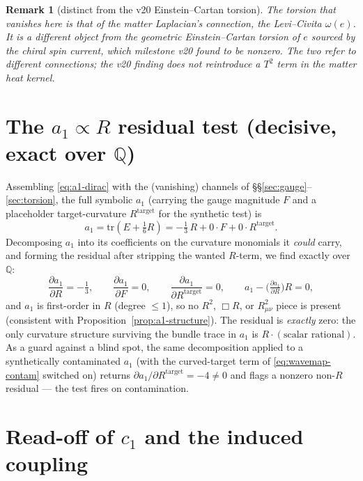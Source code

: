 \documentclass[11pt]{article}
\newtheorem{remark}{Remark}
\newcommand{\QQ}{\mathbb{Q}}
\newcommand{\tr}{\mathrm{tr}}
\newcommand{\Rt}{R^{\mathrm{target}}}
\begin{document}
\begin{remark}[distinct from the v20 Einstein--Cartan torsion]
The torsion that vanishes here is that of the \emph{matter Laplacian's} connection, the
Levi--Civita $\omega(e)$. It is a different object from the \emph{geometric} Einstein--Cartan
torsion of $e$ sourced by the chiral spin current, which milestone v20 found to be nonzero.
The two refer to different connections; the v20 finding does not reintroduce a $T^2$ term in
the matter heat kernel.
\end{remark}

\section{The $a_1\propto R$ residual test (decisive, exact over $\QQ$)}\label{sec:residual}

Assembling \eqref{eq:a1-dirac} with the (vanishing) channels of \S\S\ref{sec:gauge}--\ref{sec:torsion},
the full symbolic $a_1$ (carrying the gauge magnitude $F$ and a placeholder target-curvature
$\Rt$ for the synthetic test) is
\begin{equation}\label{eq:a1-full}
a_1=\tr(E+\tfrac16 R)= -\tfrac13\,R+0\cdot F+0\cdot \Rt .
\end{equation}
Decomposing $a_1$ into its coefficients on the curvature monomials it \emph{could} carry, and
forming the residual after stripping the wanted $R$-term, we find exactly over $\QQ$:
\begin{equation}\label{eq:residual}
\frac{\partial a_1}{\partial R}=-\tfrac13,\qquad
\frac{\partial a_1}{\partial F}=0,\qquad
\frac{\partial a_1}{\partial \Rt}=0,\qquad
a_1-\Big(\tfrac{\partial a_1}{\partial R}\Big)R=0,
\end{equation}
and $a_1$ is first-order in $R$ (degree $\le 1$), so no $R^2$, $\Box R$, or $R_{\mu\nu}^2$ piece
is present (consistent with Proposition~\ref{prop:a1-structure}). The residual is
\emph{exactly} zero: the only curvature structure surviving the bundle trace in $a_1$ is
$R\cdot(\text{scalar rational})$. As a guard against a blind spot, the same decomposition
applied to a synthetically contaminated $a_1$ (with the curved-target term of
\eqref{eq:wavemap-contam} switched on) returns $\partial a_1/\partial\Rt=-4\neq0$ and flags a
nonzero non-$R$ residual --- the test fires on contamination.

\section{Read-off of $c_1$ and the induced coupling}\label{sec:c1}
\end{document}
